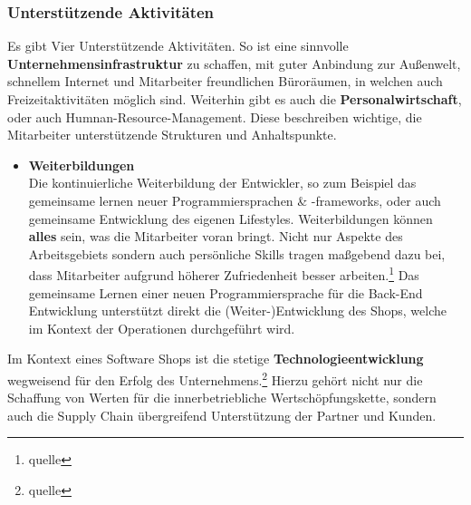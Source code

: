 \subsubsection{Unterstützende Aktivitäten}\label{unterstd_activities}
Es gibt Vier Unterstützende Aktivitäten. So ist eine sinnvolle \textbf{Unternehmensinfrastruktur} zu schaffen, mit guter Anbindung zur Außenwelt, schnellem Internet und Mitarbeiter freundlichen Büroräumen, in welchen auch Freizeitaktivitäten möglich sind. Weiterhin gibt es auch die \textbf{Personalwirtschaft}, oder auch Humnan-Resource-Management. Diese beschreiben wichtige, die Mitarbeiter unterstützende Strukturen und Anhaltspunkte.
\begin{itemize}
	\item[] \hspace{-0.6cm} \textbf{Weiterbildungen}\\
	Die kontinuierliche Weiterbildung der Entwickler, so zum Beispiel das gemeinsame lernen neuer Programmiersprachen \& -frameworks, oder auch gemeinsame Entwicklung des eigenen Lifestyles. Weiterbildungen können \textbf{alles} sein, was die Mitarbeiter voran bringt. Nicht nur Aspekte des Arbeitsgebiets sondern auch persönliche Skills tragen maßgebend dazu bei, dass Mitarbeiter aufgrund höherer Zufriedenheit besser arbeiten.\footnote{quelle} Das gemeinsame Lernen einer neuen Programmiersprache für die Back-End Entwicklung unterstützt direkt die (Weiter-)Entwicklung des Shops, welche im Kontext der Operationen durchgeführt wird.
\end{itemize}
Im Kontext eines Software Shops ist die stetige \textbf{Technologieentwicklung} wegweisend für den Erfolg des Unternehmens.\footnote{quelle} Hierzu gehört nicht nur die Schaffung von Werten für die innerbetriebliche Wertschöpfungskette, sondern auch die Supply Chain übergreifend Unterstützung der Partner und Kunden.

